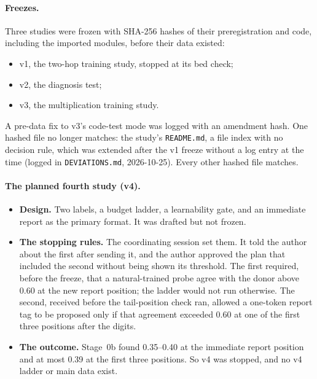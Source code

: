 \documentclass[11pt]{article}
\begin{document}
\paragraph{Freezes.} Three studies were frozen with SHA-256 hashes of their preregistration and code, including the imported modules, before their data existed:
\begin{itemize}
\item v1, the two-hop training study, stopped at its bed check;
\item v2, the diagnosis test;
\item v3, the multiplication training study.
\end{itemize}
A pre-data fix to v3's code-test mode was logged with an amendment hash. One hashed file no longer matches: the study's \texttt{README.md}, a file index with no decision rule, which was extended after the v1 freeze without a log entry at the time (logged in \texttt{DEVIATIONS.md}, 2026-10-25). Every other hashed file matches.

\paragraph{The planned fourth study (v4).}
\begin{itemize}
\item \textbf{Design.} Two labels, a budget ladder, a learnability gate, and an immediate report as the primary format. It was drafted but not frozen.
\item \textbf{The stopping rules.} The coordinating session set them. It told the author about the first after sending it, and the author approved the plan that included the second without being shown its threshold. The first required, before the freeze, that a natural-trained probe agree with the donor above 0.60 at the new report position; the ladder would not run otherwise. The second, received before the tail-position check ran, allowed a one-token report tag to be proposed only if that agreement exceeded 0.60 at one of the first three positions after the digits.
\item \textbf{The outcome.} Stage~0b found 0.35--0.40 at the immediate report position and at most 0.39 at the first three positions. So v4 was stopped, and no v4 ladder or main data exist.
\end{itemize}
\end{document}
